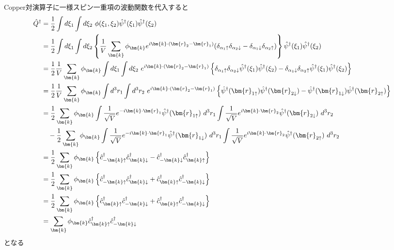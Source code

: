 \documentclass[dvipdfmx, 11pt, a4paper]{jsarticle}
\numberwithin{equation}{section}
\theoremstyle{definition}
\begin{document}
    \begin{derivationBox}
        Copper対演算子に一様スピン一重項の波動関数を代入すると
        \begin{align}
            \hat{Q}^\dagger &= \frac{1}{2}\int d\xi_1 \int d\xi_2\ \phi(\xi_1,\xi_2)\hat{\psi}^\dagger(\xi_1)\hat{\psi}^\dagger(\xi_2) \notag\\
            &=  \frac{1}{2}\int d\xi_1 \int d\xi_2 \left\{ \frac{1}{V} \sum_{\bm{k}} \phi_{\bm{k}} e^{i\bm{k}\cdot(\bm{r}_2 - \bm{r}_1)} (\delta_{\alpha_1 \uparrow} \delta_{\alpha_2\downarrow} - \delta_{\alpha_1 \downarrow} \delta_{\alpha_2\uparrow}) \right\}\hat{\psi}^\dagger(\xi_1)\hat{\psi}^\dagger(\xi_2) \notag \\
            &=  \frac{1}{2}\frac{1}{V} \sum_{\bm{k}}\phi_{\bm{k}} \int d\xi_1 \int d\xi_2\  e^{i\bm{k}\cdot(\bm{r}_2 - \bm{r}_1)} \left\{   \delta_{\alpha_1 \uparrow} \delta_{\alpha_2\downarrow}\hat{\psi}^\dagger(\xi_1)\hat{\psi}^\dagger(\xi_2) - \delta_{\alpha_1 \downarrow} \delta_{\alpha_2\uparrow} \hat{\psi}^\dagger(\xi_1)\hat{\psi}^\dagger(\xi_2)\right\} \notag \\
            &=  \frac{1}{2}\frac{1}{V} \sum_{\bm{k}}\phi_{\bm{k}} \int d^3r_1 \int d^3r_2\  e^{i\bm{k}\cdot(\bm{r}_2 - \bm{r}_1)} \left\{  \hat{\psi}^\dagger(\bm{r}_{1\uparrow})\hat{\psi}^\dagger(\bm{r}_{2\downarrow}) -  \hat{\psi}^\dagger(\bm{r}_{1\downarrow})\hat{\psi}^\dagger(\bm{r}_{2\uparrow}) \right\} \notag \\
            &= \frac{1}{2} \sum_{\bm{k}} \phi_{\bm{k}} \int \frac{1}{\sqrt{V}}e^{-i\bm{k}\cdot \bm{r}_1} \hat{\psi}^\dagger(\bm{r}_{1\uparrow})\ d^3r_1 \int \frac{1}{\sqrt{V}}e^{i\bm{k}\cdot \bm{r}_2} \hat{\psi}^\dagger (\bm{r}_{2\downarrow})\ d^3r_2 \notag \\
            &\ \ \  -\frac{1}{2} \sum_{\bm{k}} \phi_{\bm{k}} \int \frac{1}{\sqrt{V}}e^{-i\bm{k}\cdot \bm{r}_1} \hat{\psi}^\dagger(\bm{r}_{1\downarrow})\ d^3r_1 \int \frac{1}{\sqrt{V}}e^{i\bm{k}\cdot \bm{r}_2} \hat{\psi}^\dagger(\bm{r}_{2\uparrow})\ d^3r_2 \notag \\
            &= \frac{1}{2} \sum_{\bm{k}} \phi_{\bm{k}} \left\{\hat{c}_{-\bm{k}\uparrow}^\dagger \hat{c}_{\bm{k}\downarrow}^\dagger - \hat{c}_{-\bm{k}\downarrow}^\dagger \hat{c}_{\bm{k}\uparrow}^\dagger \right\} \notag \\
            &= \frac{1}{2} \sum_{\bm{k}} \phi_{\bm{k}} \left\{\hat{c}_{-\bm{k}\uparrow}^\dagger \hat{c}_{\bm{k}\downarrow}^\dagger + \hat{c}_{\bm{k}\uparrow}^\dagger \hat{c}_{-\bm{k}\downarrow}^\dagger \right\} \notag \\
            &= \frac{1}{2} \sum_{\bm{k}} \phi_{\bm{k}} \left\{\hat{c}_{\bm{k}\uparrow}^\dagger \hat{c}_{-\bm{k}\downarrow}^\dagger + \hat{c}_{\bm{k}\uparrow}^\dagger \hat{c}_{-\bm{k}\downarrow}^\dagger \right\} \notag \\
            &= \sum_{\bm{k}} \phi_{\bm{k}} \hat{c}_{\bm{k}\uparrow}^\dagger \hat{c}_{-\bm{k}\downarrow}^\dagger 
        \end{align}
        となる
    \end{derivationBox}
\end{document}
